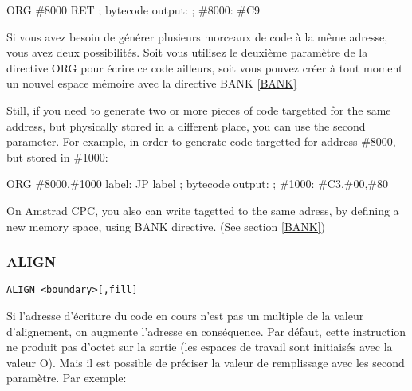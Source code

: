 \begin{code}
ORG \#8000
RET
; bytecode output:
; \#8000: \#C9
\end{code}

\begin{xfr}
  Si vous avez besoin de générer plusieurs morceaux de code à la même adresse, vous avez deux possibilités. Soit vous utilisez le deuxième paramètre de la directive ORG pour écrire ce code ailleurs, soit vous pouvez créer à tout moment un nouvel espace mémoire avec la directive BANK \ref{BANK}
\end{xfr}

\begin{xen}
Still, if you need to generate two or more pieces of code targetted for the same address, but physically stored in a different place, you can use the second parameter.
For example, in order to generate code targetted for address \#8000, but stored in \#1000:
\end{xen}



\begin{code}
ORG \#8000,\#1000
label: JP label
; bytecode output:
; \#1000: \#C3,\#00,\#80
\end{code}

\begin{xen}
On Amstrad CPC, you also can write tagetted to the same adress, by defining a new memory space, using BANK directive. (See section \ref{BANK})
\end{xen}

\subsubsection{ALIGN}
\begin{verbatim}
ALIGN <boundary>[,fill]
\end{verbatim}

\begin{xfr}
  Si l'adresse d'écriture du code en cours n'est pas un multiple de la valeur d'alignement, on augmente l'adresse en conséquence. Par défaut, cette instruction ne produit pas d'octet sur la sortie (les espaces de travail sont initiaisés avec la valeur O). Mais il est possible de préciser la valeur de remplissage avec les second paramètre. Par exemple:
\end{xfr}

